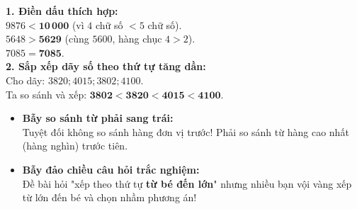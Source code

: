 \documentclass[11pt,a4paper]{article}
\begin{document}
\vspace{-2.5mm}
\noindent
\begin{minipage}[t]{0.49\textwidth}\vspace{0pt}
\begin{tcolorbox}[
  enhanced,
  colback=green!4!white,
  colframe=green!60!black,
  arc=2mm, boxrule=0.8pt,
  left=2mm, right=2mm, top=1.8mm, bottom=1.8mm,
  title={\footnotesize\bfseries\color{white}\faCheckCircle\ Ví dụ thực hành chuẩn mực}
]
{\footnotesize
\textbf{1. Điền dấu thích hợp:}\\
$9876 < \mathbf{10\,000}$ (vì $4$ chữ số $< 5$ chữ số).\\
$5648 > \mathbf{5629}$ (cùng $5600$, hàng chục $4 > 2$).\\
$7085 = \mathbf{7085}$.\\
\textbf{2. Sắp xếp dãy số theo thứ tự tăng dần:}\\
Cho dãy: $3820; 4015; 3802; 4100$.\\
Ta so sánh và xếp: $\mathbf{3802 < 3820 < 4015 < 4100}$.
}
\end{tcolorbox}
\end{minipage}
\hfill
\begin{minipage}[t]{0.49\textwidth}\vspace{0pt}
\begin{tcolorbox}[
  enhanced,
  colback=red!4!white,
  colframe=red!70!black,
  arc=2mm, boxrule=0.8pt,
  left=2mm, right=2mm, top=1.8mm, bottom=1.8mm,
  title={\footnotesize\bfseries\color{white}\faExclamationTriangle\ Mẹo tránh bẫy trắc nghiệm}
]
{\footnotesize
\begin{itemize}\setlength{\itemsep}{1.5pt}\setlength{\leftskip}{-2.5mm}
  \item \textbf{Bẫy so sánh từ phải sang trái:}\\
  Tuyệt đối không so sánh hàng đơn vị trước! Phải so sánh từ hàng cao nhất (hàng nghìn) trước tiên.
  \item \textbf{Bẫy đảo chiều câu hỏi trắc nghiệm:}\\
  Đề bài hỏi "xếp theo thứ tự \textbf{từ bé đến lớn}" nhưng nhiều bạn vội vàng xếp từ lớn đến bé và chọn nhầm phương án!
\end{itemize}
}
\end{tcolorbox}
\end{minipage}
\end{document}
